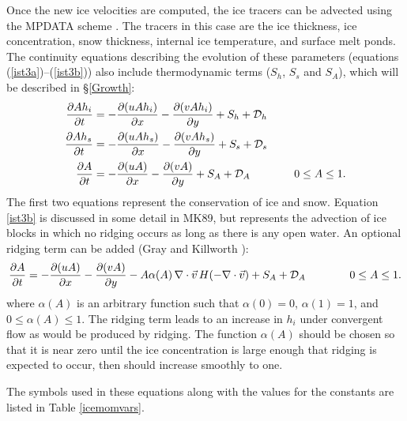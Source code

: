 Once the new ice velocities are computed, the ice tracers can be
advected using the MPDATA scheme \cite{Smolarkiewicz}. The tracers in
this case are the ice thickness, ice concentration, snow thickness,
internal ice temperature, and surface melt ponds. The continuity
equations describing the evolution of these parameters (equations
(\ref{ist3a})--(\ref{ist3b})) also include thermodynamic terms ($S_h$,
$S_s$ and $S_A$), which will be described in \S\ref{Growth}:
\begin{align}
  {\partial A h_i \over \partial t} & =
  - {\partial (u A h_i) \over \partial x} -
  {\partial (v A h_i) \over \partial y}
  + S_h + {\cal D}_h
\label{ist3a} \\
  {\partial A h_s \over \partial t} & =
  - {\partial (u A h_s) \over \partial x} -
  {\partial (v A h_s) \over \partial y}
  + S_s + {\cal D}_s
\label{ist3c} \\
  {\partial A \over \partial t} & =
  - {\partial (uA) \over \partial x} - {\partial (vA) \over \partial y}
  + S_A + {\cal D}_A \qquad \qquad 0 \leq A \leq 1 .
\label{ist3b}
\end{align}
The first two equations represent the conservation of ice and snow.
Equation \ref{ist3b} is discussed in some detail in MK89, but
represents the advection of ice blocks in which no ridging occurs as
long as there is any open water. An optional ridging term can be added
(Gray and Killworth \cite{Gray96}):
\begin{equation}
  {\partial A \over \partial t} =
  - {\partial (uA) \over \partial x} - {\partial (vA) \over \partial y}
  - A \alpha(A) \, \nabla \cdot \vec{v} \, H(-\nabla \cdot \vec{v})
  + S_A + {\cal D}_A \qquad \qquad 0 \leq A \leq 1 .
\end{equation}
where $\alpha(A)$ is an arbitrary function such that $\alpha(0) = 0$,
$\alpha(1) = 1$, and $0 \leq \alpha(A) \leq 1$. The ridging term leads
to an increase in $h_i$ under convergent flow as would be produced by
ridging. The function $\alpha(A)$ should be chosen so that it is near
zero until the ice concentration is large enough that ridging is
expected to occur, then should increase smoothly to one.

The symbols used in these equations along with the values for the
constants are listed in Table \ref{icemomvars}.

